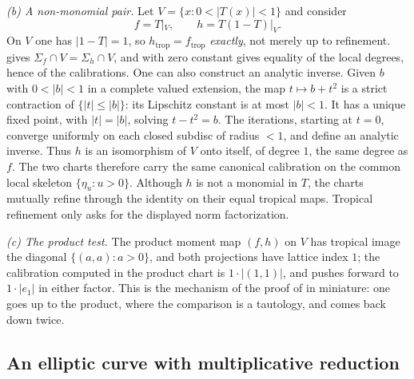 \begin{example}
\emph{(b) A non-monomial pair.} Let $V=\{x:0<|T(x)|<1\}$ and consider
\[
 f=T|_V,\qquad h=T(1-T)|_V .
\]
On $V$ one has $|1-T|=1$, so $h_{\mathrm{trop}}=f_{\mathrm{trop}}$
\emph{exactly}, not merely up to refinement.
 gives $\Sigma_f\cap V=\Sigma_h\cap V$, and
 with zero constant gives equality of the
local degrees, hence of the calibrations. One can also construct an
analytic inverse. Given $b$ with $0<|b|<1$ in a complete valued extension,
the map $t\mapsto b+t^2$ is a strict contraction of $\{|t|\le|b|\}$:
its Lipschitz constant is at most $|b|<1$. It has a unique fixed point,
with $|t|=|b|$, solving $t-t^2=b$. The iterations, starting at $t=0$,
converge uniformly on each closed subdisc of radius $<1$, and define an
analytic inverse. Thus $h$ is an isomorphism of $V$ onto itself, of degree
$1$, the same degree as $f$. The
two charts therefore carry the same canonical calibration on the common
local skeleton $\{\eta_u:u>0\}$. Although $h$ is not a monomial in $T$,
the charts mutually refine through the identity on their equal tropical
maps. Tropical refinement only asks for the displayed norm factorization.

\emph{(c) The product test.} The product moment map $(f,h)$ on $V$ has
tropical image the diagonal $\{(a,a):a>0\}$, and both projections have
lattice index $1$; the calibration computed in the product chart is
$1\cdot|(1,1)|$, and pushes forward to $1\cdot|e_1|$ in either factor. This
is the mechanism of the proof of
 in miniature: one goes up to
the product, where the comparison is a tautology, and comes back down twice.
\end{example}

\subsection{An elliptic curve with multiplicative reduction}

